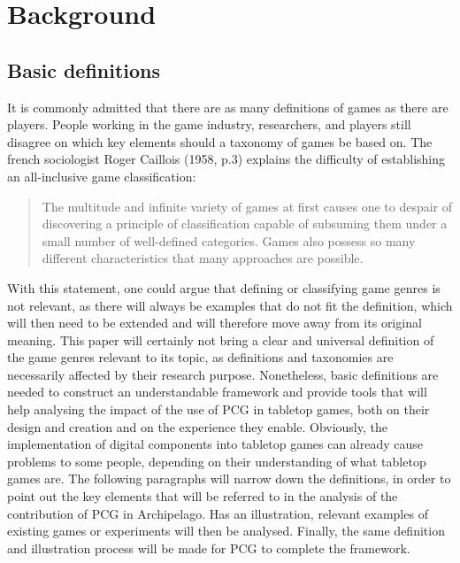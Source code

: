 \section{Background}
\subsection{Basic definitions}
It is commonly admitted that there are as many definitions of games as there are players. People working in the game industry, researchers, and players still disagree on which key elements should a taxonomy of games be based on. The french sociologist Roger Caillois (1958, p.3) explains the difficulty of establishing an all-inclusive game classification:
\begin{quotation}
The multitude and infinite variety of games at first causes one to despair of discovering a principle of classification capable of subsuming them under a small number of well-defined categories. Games also possess so many different characteristics that many approaches are possible.
\end{quotation} 
With this statement, one could argue that defining or classifying game genres is not relevant, as there will always be examples that do not fit the definition, which will then need to be extended and will therefore move away from its original meaning. This paper will certainly not bring a clear and universal definition of the game genres relevant to its topic, as definitions and taxonomies are necessarily affected by their research purpose. Nonetheless, basic definitions are needed to construct an understandable framework and provide tools that will help analysing the impact of the use of PCG in tabletop games, both on their design and creation and on the experience they enable.
Obviously, the implementation of digital components into tabletop games can already cause problems to some people, depending on their understanding of what tabletop games are. The following paragraphs will narrow down the definitions, in order to point out the key elements that will be referred to in the analysis of the contribution of PCG in Archipelago. Has an illustration, relevant examples of existing games or experiments will then be analysed. Finally, the same definition and illustration process will be made for PCG to complete the framework.
